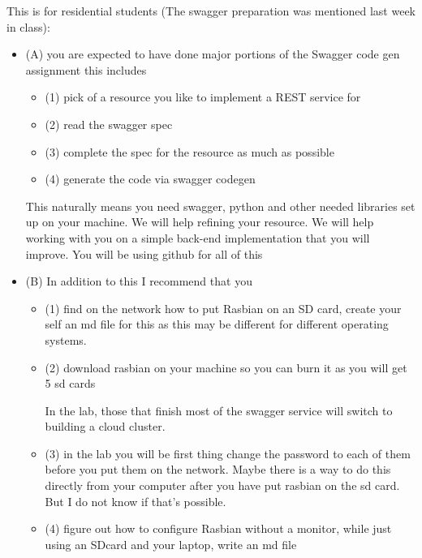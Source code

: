 \begin{exercise}
  This is for residential students (The swagger preparation was
  mentioned last week in class):

 \begin{itemize}

 \item (A) you are expected to have done major portions of the Swagger
   code gen assignment this includes

  \begin{itemize}
  \item (1) pick of a resource you like to implement a REST service
    for
  \item (2) read the swagger spec
  \item (3) complete the spec for the resource as much as possible
  \item (4) generate the code via swagger codegen
  \end{itemize}

  This naturally means you need swagger, python and other needed
  libraries set up on your machine. We will help refining your
  resource. We will help working with you on a simple back-end
  implementation that you will improve. You will be using github for
  all of this

\item (B) In addition to this I recommend that you

  \begin{itemize}

  \item (1) find on the network how to put Rasbian on an SD card,
    create your self an md file for this as this may be different for
    different operating systems.

 
  \item (2) download rasbian on your machine so you can burn it as you
    will get 5 sd cards
 
    In the lab, those that finish most of the swagger service will
    switch to building a cloud cluster.
 
  \item (3) in the lab you will be first thing change the password to
    each of them before you put them on the network. Maybe there is a
    way to do this directly from your computer after you have put
    rasbian on the sd card. But I do not know if that's possible.

 
  \item (4) figure out how to configure Rasbian without a monitor,
    while just using an SDcard and your laptop, write an md file


\end{itemize}
\end{itemize}
\end{exercise}
